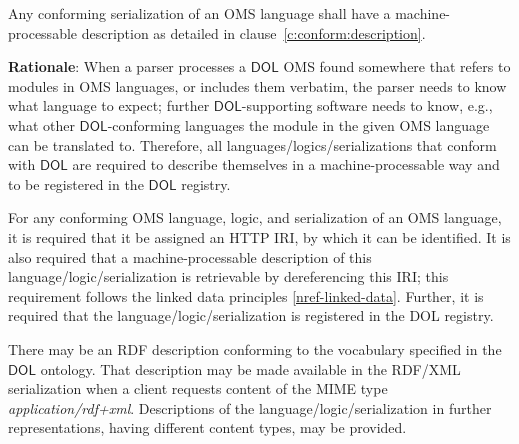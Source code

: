 \documentclass[10pt, a4paper]{isov2}
\makeatletter
\newcommand*\CommentAuthor{}
\renewcommand*\CommentAuthor{#1}}
\newcommand*\CommentDate{}
\renewcommand*\CommentDate{#1}}
\newcommand*\CommentId{}
\renewcommand*\CommentId{#1}}
\newcommand*\CommentType{}
\renewcommand*\CommentType{#1}}
\newcommand*{\SetCommentColorByType}[1]{%
\edef\localType{{#1}}%
\expandafter\ifstrequal\localType{q-aut}{\colorlet{CommentColor}{red}}{%
\expandafter\ifstrequal\localType{q-all}{\colorlet{CommentColor}{orange}}{%
\expandafter\ifstrequal\localType{todo}{\colorlet{CommentColor}{orange}}{%
\expandafter\ifstrequal\localType{fyi}{\colorlet{CommentColor}{lightgray}}{%
\colorlet{CommentColor}{yellow}}}}}}
\newcommand*{\SetCommentPrefixByType}[1]{%
\edef\localType{{#1}}%
\expandafter\@ifmtarg\localType{%
\edef\CommentPrefix{}%
}{%
\caseupper[q]{#1}%
\edef\CommentPrefix{\thestring: }%
}}
\newcommand*{\initComment}[1]{%
\setkeys{Comment}{#1}%
\SetCommentColorByType{\CommentType}%
\relax%
\SetCommentPrefixByType{\CommentType}%
\relax%
}
\newcommand*{\todonote}[2][]{%
\initComment{#1}%
\pdfcomment[author=\CommentAuthor,color=CommentColor,date=\CommentDate,id=\CommentId]{%
\CommentPrefix
#2}}
\renewcommand*{\todonote}[2][]{%
\initComment{#1}%
\ednote{\CommentPrefix #2}}
\newcommand*{\CLnote}[2][author=Christoph Lange]{%
\todonote[author=Christoph Lange,#1]{#2}}
\newcommand*{\mimetype}[1]{\textit{#1}}
\newcommand*{\DOL}{\ensuremath{\mathsf{DOL}}\xspace}
\renewcommand{\clauserefname}{clause}
\renewcommand{\noterefname}{note}
\renewcommand{\cref}[1]{\clauserefname~\ref{#1}}
\renewcommand{\nref}[1]{\noterefname~\ref{#1}}
\renewcommand{\nref}[1]{\ref{nref-#1}}
\makeatother
\begin{document}
Any conforming serialization of an OMS language shall have a machine-proces\-sable description as detailed in \cref{c:conform:description}.



\label{c:conform:description}

\begin{mdframed}
\textbf{Rationale}: When a parser processes a \DOL OMS found somewhere that refers to modules in OMS languages, or includes them verbatim, the parser needs to know what language to expect; further \DOL-supporting software needs to know, e.g., what other \DOL-conforming languages the module in the given OMS language can be translated to.  Therefore,   all languages/logics/serializations that conform with \DOL are required to describe themselves in a machine-processable way and to be
registered in the \DOL registry.
\end{mdframed}

For any conforming OMS language, logic, and serialization of an OMS language, it is required that
it be assigned an HTTP IRI, by which it can be identified.  It is also required that a
machine-processable description of this language/logic/serialization is retrievable by
dereferencing this IRI; this requirement follows the linked data principles
\nref{linked-data}. Further, it is required that the language/logic/serialization is registered in the DOL registry.


There may be an RDF description conforming to the vocabulary
specified in the \DOL ontology. That description may be made available in the RDF/XML
serialization when a client requests content of the MIME type \mimetype{application/rdf+xml}.
Descriptions of the language/logic/serialization in further representations, having different
content types, may be provided.%











\end{document}
